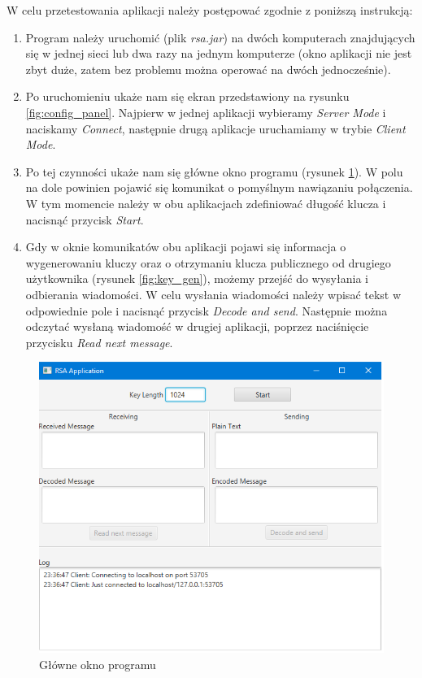 \documentclass[10pt,a4paper]{article}
\begin{document}
W celu przetestowania aplikacji należy postępować zgodnie z poniższą instrukcją:

\begin{enumerate}
\item Program należy uruchomić (plik \textit{rsa.jar}) na dwóch komputerach znajdujących się w jednej sieci lub dwa razy na jednym komputerze (okno aplikacji nie jest zbyt duże, zatem bez problemu można operować na dwóch jednocześnie).

\item Po uruchomieniu ukaże nam się ekran przedstawiony na rysunku \ref{fig:config_panel}. Najpierw w jednej aplikacji wybieramy \textit{Server Mode} i naciskamy \textit{Connect}, następnie drugą aplikacje uruchamiamy w trybie \textit{Client Mode}.

\item Po tej czynności ukaże nam się główne okno programu (rysunek \ref{fig:main_window}). W polu na dole powinien pojawić się komunikat o pomyślnym nawiązaniu połączenia. W tym momencie należy w obu aplikacjach zdefiniować długość klucza i nacisnąć przycisk \textit{Start}.

\item Gdy w oknie komunikatów obu aplikacji pojawi się informacja o wygenerowaniu kluczy oraz o otrzymaniu klucza publicznego od drugiego użytkownika (rysunek \ref{fig:key_gen}), możemy przejść do wysyłania i odbierania wiadomości. W celu wysłania wiadomości należy wpisać tekst w odpowiednie pole i nacisnąć przycisk \textit{Decode and send}. Następnie można odczytać wysłaną wiadomość w drugiej aplikacji, poprzez naciśnięcie przycisku \textit{Read next message}.
\end{enumerate}

\begin{figure}[!t]
	\centering
	\includegraphics[scale=0.85]{img/main_window.png}
	\caption{Główne okno programu}
	\label{fig:main_window}
\end{figure}
\end{document}
